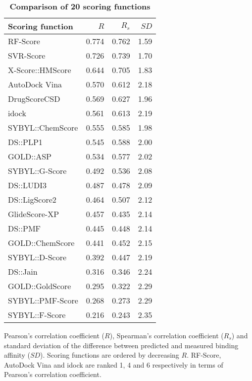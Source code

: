 \documentclass[10pt]{article}
\begin{document}
\begin{table}[!ht]
\caption{
\bf{Comparison of 20 scoring functions}}
\begin{tabular}{lrrr}
\hline
Scoring function & $R$ & $R_s$ & $SD$\\
\hline
RF-Score & 0.774 & 0.762 & 1.59\\
SVR-Score & 0.726 & 0.739 & 1.70\\
X-Score::HMScore & 0.644 & 0.705 & 1.83\\
AutoDock Vina & 0.570 & 0.612 & 2.18\\
DrugScoreCSD & 0.569 & 0.627 & 1.96\\
idock & 0.561 & 0.613 & 2.19\\
SYBYL::ChemScore & 0.555 & 0.585 & 1.98\\
DS::PLP1 & 0.545 & 0.588 & 2.00\\
GOLD::ASP & 0.534 & 0.577 & 2.02\\
SYBYL::G-Score & 0.492 & 0.536 & 2.08\\
DS::LUDI3 & 0.487 & 0.478 & 2.09\\
DS::LigScore2 & 0.464 & 0.507 & 2.12\\
GlideScore-XP & 0.457 & 0.435 & 2.14\\
DS::PMF & 0.445 & 0.448 & 2.14\\
GOLD::ChemScore & 0.441 & 0.452 & 2.15\\
SYBYL::D-Score & 0.392 & 0.447 & 2.19\\
DS::Jain & 0.316 & 0.346 & 2.24\\
GOLD::GoldScore & 0.295 & 0.322 & 2.29\\
SYBYL::PMF-Score & 0.268 & 0.273 & 2.29\\
SYBYL::F-Score & 0.216 & 0.243 & 2.35\\
\end{tabular}
\begin{flushleft}\label{ScoringFunctionComparison} Pearson's correlation coefficient ($R$), Spearman's correlation coefficient ($R_s$) and standard deviation of the difference between predicted and measured binding affinity ($SD$). Scoring functions are ordered by decreasing $R$. RF-Score, AutoDock Vina and idock are ranked 1, 4 and 6 respectively in terms of Pearson's correlation coefficient.
\end{flushleft}
\label{tab:label}
\end{table}
\end{document}
